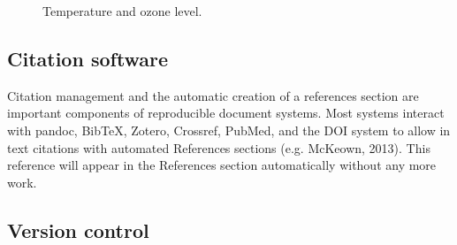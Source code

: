 \documentclass[
  letterpaper,
  DIV=11,
  numbers=noendperiod]{scrreprt}
\begin{document}
\begin{figure}


\caption{\label{fig-airquality}Temperature and ozone level.}

\end{figure}%

\subsection{Citation software}\label{citation-software}

Citation management and the automatic creation of a references section
are important components of reproducible document systems. Most systems
interact with pandoc, BibTeX, Zotero, Crossref, PubMed, and the DOI
system to allow in text citations with automated References sections
(e.g. McKeown, 2013). This reference will appear in the References
section automatically without any more work.

\subsection{Version control}\label{version-control}
\end{document}
